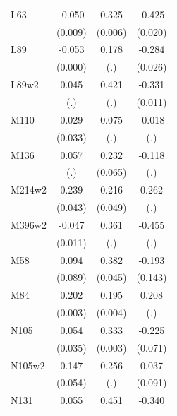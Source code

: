 \begin{table}[htbp]
\begin{tabular}{l*{3}{c}}
L63             &   -0.050\sym{***}&    0.325\sym{***}&   -0.425\sym{***}\\
                &  (0.009)         &  (0.006)         &  (0.020)         \\
L89             &   -0.053\sym{***}&    0.178         &   -0.284\sym{***}\\
                &  (0.000)         &      (.)         &  (0.026)         \\
L89w2           &    0.045         &    0.421         &   -0.331\sym{***}\\
                &      (.)         &      (.)         &  (0.011)         \\
M110            &    0.029         &    0.075         &   -0.018         \\
                &  (0.033)         &      (.)         &      (.)         \\
M136            &    0.057         &    0.232\sym{***}&   -0.118         \\
                &      (.)         &  (0.065)         &      (.)         \\
M214w2          &    0.239\sym{***}&    0.216\sym{***}&    0.262         \\
                &  (0.043)         &  (0.049)         &      (.)         \\
M396w2          &   -0.047\sym{***}&    0.361         &   -0.455         \\
                &  (0.011)         &      (.)         &      (.)         \\
M58             &    0.094         &    0.382\sym{***}&   -0.193         \\
                &  (0.089)         &  (0.045)         &  (0.143)         \\
M84             &    0.202\sym{***}&    0.195\sym{***}&    0.208         \\
                &  (0.003)         &  (0.004)         &      (.)         \\
N105            &    0.054         &    0.333\sym{***}&   -0.225\sym{***}\\
                &  (0.035)         &  (0.003)         &  (0.071)         \\
N105w2          &    0.147\sym{***}&    0.256         &    0.037         \\
                &  (0.054)         &      (.)         &  (0.091)         \\
N131            &    0.055\sym{***}&    0.451         &   -0.340\sym{***}\\

\end{tabular}
\end{table}
